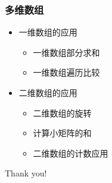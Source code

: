 \begin{frame}[fragile]
    \frametitle{多维数组}

    \begin{itemize}[<+->]
        \item 一维数组的应用
        
            \begin{itemize}
                \item 一维数组部分求和
                \item 一维数组遍历比较
            \end{itemize}

        \item 二维数组的应用
        
            \begin{itemize}
                \item 二维数组的旋转
                \item 计算小矩阵的和
                \item 二维数组的计数应用
            \end{itemize}

    \end{itemize}
\end{frame}

\begin{frame}
    \begin{center}
        {\Huge Thank you!}
    \end{center}
\end{frame}


